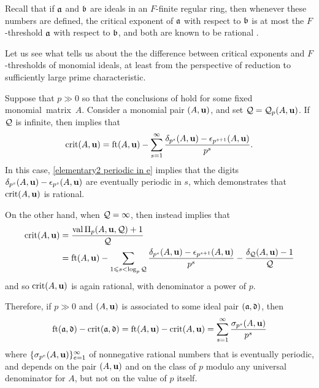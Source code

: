 \documentclass[11pt]{amsart}
\begin{document}
\begin{remark}  
\label{crit versus ft: R}
Recall that if $\mathfrak{a}$ and $\mathfrak{b}$ are ideals in an $F$-finite regular ring, then whenever these numbers are defined, the critical exponent of $\mathfrak{a}$ with respect to $\mathfrak{b}$ is at most the $F$-threshold $\mathfrak{a}$ with respect to $\mathfrak{b}$, and both are known to be rational \cite[Corollary~5.8]{hernandez+etal.frobenius_powers}.  

Let us see what  tells us about the the difference between critical exponents and $F$-thresholds of monomial ideals, at least from the perspective of reduction to sufficiently large prime characteristic.  

Suppose that $p \gg 0$ so that the conclusions of  hold for some fixed monomial~matrix~$A$.  Consider a monomial pair $(A,\mathbf{u})$, and set  $\mathcal{Q} = \mathcal{Q}_p(A,\mathbf{u})$.  If $\mathcal{Q}$ is infinite, then   implies that
%
\[ \operatorname{crit}(A,\mathbf{u})=\operatorname{ft}(A, \mathbf{u}) - \sum_{s=1}^{\infty} \frac{\delta_{p^s}(A,\mathbf{u})-\epsilon_{p^{s+1}}(A,\mathbf{u})}{p^s}. \] 
%
In this case, \eqref{elementary2 periodic in e} implies that the digits $\delta_{p^s}(A,\mathbf{u})-\epsilon_{p^s}(A,\mathbf{u})$ are eventually periodic in $s$, which demonstrates that $\operatorname{crit}(A,\mathbf{u})$ is rational.

On the other hand, when $\mathcal{Q} = \infty$, then  instead implies that
\begin{align*} 
\operatorname{crit}(A,\mathbf{u})& = \frac{\operatorname{val} \Pi_p(A,\mathbf{u}, \mathcal{Q}) +1}{\mathcal{Q}} \\ 
& = \operatorname{ft}(A, \mathbf{u}) -  \sum_{1 \leqslant s < \log_p \mathcal{Q}} \frac{\delta_{p^s}(A,\mathbf{u})-\epsilon_{p^{s+1}}(A,\mathbf{u})}{p^s} -  \frac{ \delta_{\mathcal{Q}}(A,\mathbf{u})-1}{\mathcal{Q}}
\end{align*}
and so $\operatorname{crit}(A,\mathbf{u})$ is again rational, with denominator a power of $p$. 

Therefore, if $p \gg 0$ and $(A,\mathbf{u})$ is associated to some ideal pair $(\mathfrak{a}, \mathfrak{d})$, then 
\[ \operatorname{ft}(\mathfrak{a}, \mathfrak{d}) - \operatorname{crit}(\mathfrak{a}, \mathfrak{d}) = \operatorname{ft}(A, \mathbf{u})-\operatorname{crit}(A,\mathbf{u}) = \sum_{s=1}^{\infty} \frac{ \sigma_{p^s}(A,\mathbf{u})}{p^s} \] 
where $\{ \sigma_{p^e}(A,\mathbf{u}) \}_{e=1}^{\infty}$ of nonnegative rational numbers that is eventually periodic, and depends on the pair $(A,\mathbf{u})$ and on the class of $p$ modulo any universal denominator for $A$, but not on the value of $p$ itself.
\end{remark}
\end{document}

